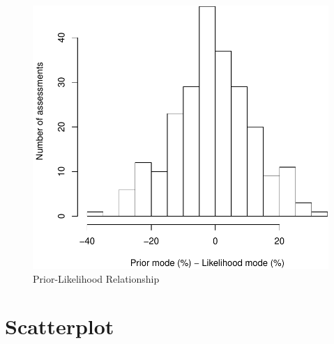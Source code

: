 \documentclass[12pt,a4paper]{article}
\begin{document}
\begin{figure}[H]

{\centering \includegraphics{squeacAttack_files/figure-latex/likehist-1} 

}

\caption{Prior-Likelihood Relationship}\label{fig:likehist}
\end{figure}

\newpage

\hypertarget{scatterplot}{%
\section{Scatterplot}\label{scatterplot}}
\end{document}
